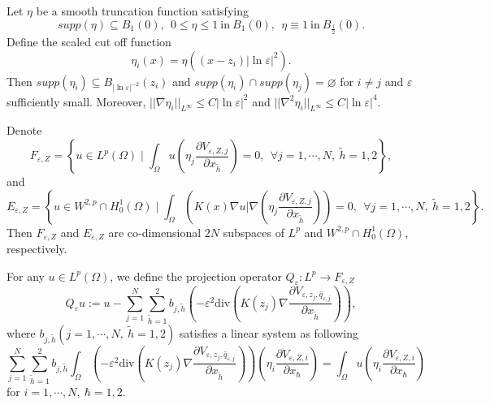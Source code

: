 \documentclass[12pt,reqno]{amsart}
\numberwithin{equation}{section}
\theoremstyle{definition}
\theoremstyle{remark}
\begin{document}
Let $ \eta $ be a smooth  truncation function satisfying
\begin{equation*}
supp(\eta)\subseteq B_1(0),\ \ 0\leq \eta\leq 1\ \text{in}\ B_{1}(0),\   \  \eta\equiv1\ \text{in}\ B_{\frac{1}{2}}(0).
\end{equation*}
Define the scaled cut off function 
\begin{equation}\label{cut off fun}
\eta_i(x)=\eta\left ((x-z_i)|\ln\varepsilon|^2\right ).
\end{equation}
 Then $ supp(\eta_i)\subseteq B_{|\ln\varepsilon|^{-2}}(z_i) $ and $ supp(\eta_i)\cap supp(\eta_j)=\varnothing $ for $ i\neq j $ and $ \varepsilon $ sufficiently small. Moreover, $ ||\nabla\eta_i||_{L^\infty}\leq C|\ln\varepsilon|^{2} $ and $ ||\nabla^2\eta_i||_{L^\infty}\leq C|\ln\varepsilon|^{4} $.

Denote
\begin{equation}\label{204}
F_{\varepsilon,Z}=\left \{u\in L^p(\Omega)\mid \int_{\Omega}u\left( \eta_j\frac{\partial V_{\varepsilon, Z,j}}{\partial x_{\tilde{h}}}\right) =0,\ \ \forall j=1,\cdots,N,\ \tilde{h}=1,2\right \},
\end{equation}
and
\begin{equation}\label{205}
E_{\varepsilon,Z}=\left \{u\in W^{2,p}\cap H^1_0(\Omega)\mid \int_{\Omega}\left (K(x)\nabla u| \nabla \left( \eta_j\frac{\partial V_{\varepsilon, Z,j}}{\partial x_{\tilde{h}}}\right)\right )=0,\ \ \forall j=1,\cdots,N,\ \tilde{h}=1,2\right \}.
\end{equation}
Then $ F_{\varepsilon,Z}$ and $ E_{\varepsilon,Z} $ are co-dimensional $ 2N $ subspaces of $ L^p $ and $ W^{2,p}\cap H^1_0(\Omega) $, respectively.

For any $ u\in L^p(\Omega) $, we  define the projection operator $ Q_\varepsilon: L^p \to  F_{\varepsilon,Z} $
\begin{equation}\label{206}
Q_\varepsilon u:=u-\sum_{j=1}^N\sum_{\tilde{h}=1}^2b_{j,\tilde{h}}\left( -\varepsilon^2\text{div}\left (K(z_j)\nabla   \frac{\partial V_{\varepsilon, z_j, \hat{q}_{\varepsilon,j}}}{\partial x_{\tilde{h}}}\right )\right) ,
\end{equation}
where $ b_{j,\tilde{h}} (j=1,\cdots,N,\ \tilde{h}=1,2) $ satisfies a linear system as following
\begin{equation*}%
\sum_{j=1}^N\sum_{\tilde{h}=1}^2b_{j,\tilde{h}}\int_{\Omega}\left( -\varepsilon^2\text{div}\left (K(z_j)\nabla   \frac{\partial V_{\varepsilon, z_j, \hat{q}_{\varepsilon,j}}}{\partial x_{\tilde{h}}}\right )\right)\left( \eta_i\frac{\partial V_{\varepsilon, Z,i}}{\partial x_\hbar}\right)=\int_{\Omega}u \left( \eta_i\frac{\partial V_{\varepsilon, Z,i}}{\partial x_\hbar}\right)
\end{equation*}
for $ i=1,\cdots,N,\ \hbar=1,2. $
\end{document}
